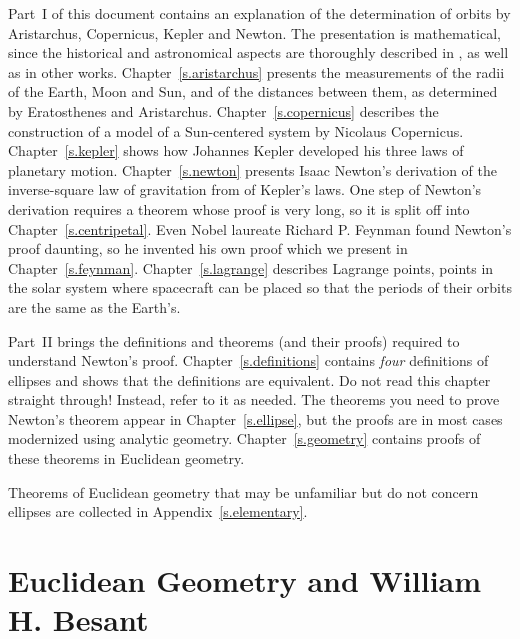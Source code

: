 Part~I of this document contains an explanation of the determination of orbits by Aristarchus, Copernicus, Kepler and Newton. The presentation is mathematical, since the historical and astronomical aspects are thoroughly described in \cite{hahn-cic}, as well as in other works. Chapter~\ref{s.aristarchus} presents the measurements of the radii of the Earth, Moon and Sun, and of the distances between them, as determined by Eratosthenes and Aristarchus. Chapter~\ref{s.copernicus} describes the construction of a model of a Sun-centered system by Nicolaus Copernicus. Chapter~\ref{s.kepler} shows how Johannes Kepler developed his three laws of planetary motion. Chapter~\ref{s.newton} presents Isaac Newton's derivation of the inverse-square law of gravitation from of Kepler's laws. One step of Newton's derivation requires a theorem whose proof is very long, so it is split off into Chapter~\ref{s.centripetal}. Even Nobel laureate Richard P. Feynman found Newton's proof daunting, so he invented his own proof which we present in Chapter~\ref{s.feynman}. Chapter~\ref{s.lagrange} describes Lagrange points, points in the solar system where spacecraft can be placed so that the periods of their orbits are the same as the Earth's.

Part~II brings the definitions and theorems (and their proofs) required to understand Newton's proof. Chapter~\ref{s.definitions} contains \emph{four} definitions of ellipses and shows that the definitions are equivalent. Do not read this chapter straight through! Instead, refer to it as needed. The theorems you need to prove Newton's theorem appear in Chapter~\ref{s.ellipse}, but the proofs are in most cases modernized using analytic geometry.  Chapter~\ref{s.geometry} contains proofs of these theorems in Euclidean geometry.

Theorems of Euclidean geometry that may be unfamiliar but do not concern ellipses are collected in Appendix~\ref{s.elementary}. 

\section*{Euclidean Geometry and William H. Besant}

